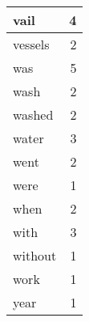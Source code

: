 \begin{center}
\begin{longtable}{l|r}
vail & 4 \\ \hline
vessels & 2 \\ \hline
was & 5 \\ \hline
wash & 2 \\ \hline
washed & 2 \\ \hline
water & 3 \\ \hline
went & 2 \\ \hline
were & 1 \\ \hline
when & 2 \\ \hline
with & 3 \\ \hline
without & 1 \\ \hline
work & 1 \\ \hline
year & 1 \\ \hline
\end{longtable}
\end{center}



\normalsize



